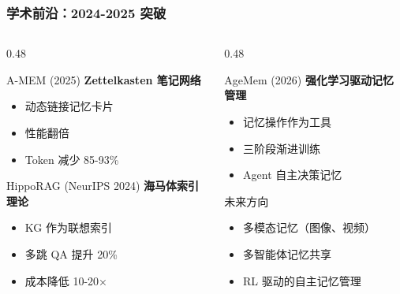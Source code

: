 \documentclass[aspectratio=169,10pt]{beamer}
\begin{document}
\begin{frame}
  \frametitle{学术前沿：2024-2025 突破}

  \begin{columns}[T]
    \begin{column}{0.48\textwidth}
      \begin{block}{A-MEM (2025)}
        \footnotesize
        \textbf{Zettelkasten 笔记网络}
        \begin{itemize}
          \item 动态链接记忆卡片
          \item 性能翻倍
          \item Token 减少 85-93\%
        \end{itemize}
      \end{block}

      \vspace{0.2cm}

      \begin{block}{HippoRAG (NeurIPS 2024)}
        \footnotesize
        \textbf{海马体索引理论}
        \begin{itemize}
          \item KG 作为联想索引
          \item 多跳 QA 提升 20\%
          \item 成本降低 10-20×
        \end{itemize}
      \end{block}
    \end{column}

    \begin{column}{0.48\textwidth}
      \begin{block}{AgeMem (2026)}
        \footnotesize
        \textbf{强化学习驱动记忆管理}
        \begin{itemize}
          \item 记忆操作作为工具
          \item 三阶段渐进训练
          \item Agent 自主决策记忆
        \end{itemize}
      \end{block}

      \vspace{0.2cm}

      \begin{alertblock}{未来方向}
        \footnotesize
        \begin{itemize}
          \item 多模态记忆（图像、视频）
          \item 多智能体记忆共享
          \item RL 驱动的自主记忆管理
        \end{itemize}
      \end{alertblock}
    \end{column}
  \end{columns}
\end{frame}
\end{document}
